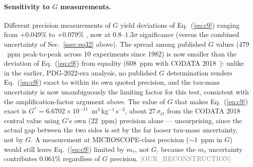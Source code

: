 \documentclass[twocolumn,prd,amsmath,amssymb,floatfix]{revtex4-2}
\newcommand{\reconstruction}{\textcolor{gray}{\small[OUR\_RECONSTRUCTION]}}
\begin{document}
\paragraph{Sensitivity to $G$ measurements.}
Different precision measurements of $G$ yield deviations of Eq.~(\ref{eq:c9})
ranging from $+0.049\%$ \cite{luo2009} to $+0.079\%$ \cite{quinn2013},
now at $0.8$--$1.3\sigma$ significance (versus the combined uncertainty of
Sec.~\ref{ssec:eq32} above). The spread among published $G$ values
($479$~ppm peak-to-peak across 10 experiments since 1982) is now smaller
than the deviation of Eq.~(\ref{eq:c9}) from equality ($608$~ppm with
CODATA 2018~\cite{codata2018}): unlike in the earlier, PDG-2022-era
analysis, no published $G$ determination renders Eq.~(\ref{eq:c9}) exact to
within its own quoted precision, and the tau-mass uncertainty is now
unambiguously the limiting factor for this test, consistent with the
amplification-factor argument above. The value of $G$ that makes
Eq.~(\ref{eq:c9}) exact is $G^* = 6.6702 \times 10^{-11}$~m$^3$\,kg$^{-1}$\,s$^{-2}$,
about $27\,\sigma_G$ from the CODATA 2018 central value using $G$'s own
(22~ppm) precision alone --- unsurprising, since the actual gap between the
two sides is set by the far looser tau-mass uncertainty, not by $G$. A
measurement at MICROSCOPE-class precision ($\sim\!1$~ppm in $G$) would
still leave Eq.~(\ref{eq:c9}) limited by $m_\tau$, not $G$, because the
$m_\tau$ uncertainty contributes $0.061\%$ regardless of $G$ precision.
\reconstruction
\end{document}
